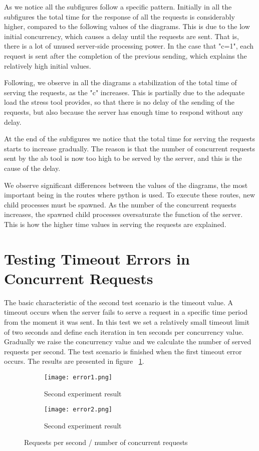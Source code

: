 As we notice all the subfigures follow a specific pattern. Initially in all the subfigures the total time for the response of all the requests is considerably higher, compared to the following values of the diagrams. This is due to the low initial concurrency, which causes a delay until the requests are sent. That is, there is a lot of unused server-side processing power. In the case that "c=1", each request is sent after the completion of the previous sending, which explains the relatively high initial values. \par 
	Following, we observe in all the diagrams a stabilization of the total time of serving the requests, as the "c" increases. This is partially due to the adequate load the stress tool provides, so that there is no delay of the sending of the requests, but also because the server has enough time to respond without any delay. \par 
	At the end of the subfigures we notice that the total time for serving the requests starts to increase gradually. The reason is that the number of concurrent requests sent by the ab tool is now too high to be served by the server, and this is the cause of the delay. \par 
	We observe significant differences between the values of the diagrams, the most important being in the routes where python is used. To execute these routes, new child processes must be spawned. As the number of the concurrent requests increases, the spawned child processes oversaturate the function of the server. This is how the higher time values in serving the requests are explained.  

	
\section{Testing Timeout Errors in Concurrent Requests}
The basic characteristic of the second test scenario is the timeout value. A timeout occurs when the server fails to serve a request in a specific time period from the moment it was sent. In this test we set a relatively small timeout limit of two seconds and define each iteration in ten seconds per concurrency value. Gradually we raise the concurrency value and we calculate the number of served requests per second. The test scenario is finished when the first timeout error occurs. The results are presented in figure ~\ref{experiment_fig2}. \par 


\begin{figure}
\centering
\begin{subfigure}{1\textwidth}
  \centering
  \centerline{\texttt{[image: error1.png]}}
  \caption{Second experiment result}
\end{subfigure}
\begin{subfigure}{1\textwidth}
  \centering
  \centerline{\texttt{[image: error2.png]}}
  \caption{Second experiment result}
\end{subfigure}
\caption{Requests per second / number of concurrent requests}
\label{experiment_fig2}
\end{figure}


